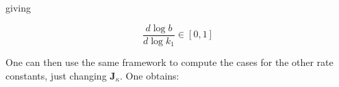 \documentclass{article}
\begin{document}
	giving
	
	\begin{center}
		\begin{equation}
			\frac{d \log b}{d \log k_1} \in \left[0,1\right]
		\end{equation}
	\end{center}
	

	
	One can then use the same framework to compute the cases for the other rate constants, just changing $\mathbf{J}_{\kappa}$. One obtains:
	
\end{document}
